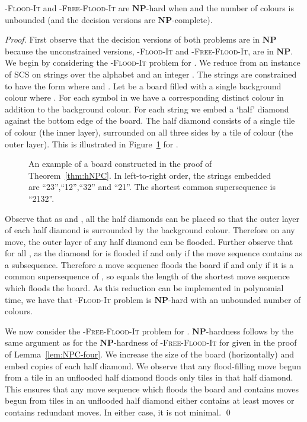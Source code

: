 \documentclass[a4paper,11pt]{llncs}
\newcommand{\pgfgraphic}[1]{}
\newcounter{l}
\newcommand{\NPtime}{\ensuremath{\mathbf{NP}}}
\newcommand{\Coloroid}[1]{-\textsc{Flood-It}}
\newcommand{\ColoroidFree}[1]{-\textsc{Free-Flood-It}}
\newcommand{\SCS}{\textsc{SCS}}
\newcommand{\recdim}[2]{}
\begin{document}
\begin{theorem}
    \label{thm:hNPC}
     \Coloroid{(c,h)} and \ColoroidFree{(c,h)} are \NPtime-hard when  and the number of colours  is unbounded (and the decision versions are \NPtime-complete).
\end{theorem}
\begin{proof}
First observe that the decision versions of both problems are in \NPtime{} because the unconstrained versions, \Coloroid{c} and \ColoroidFree{c}, are in \NPtime{}. We begin by considering the \Coloroid{(c,h)} problem for . We reduce from an instance of \SCS{} on  strings  over the alphabet  and an integer . The strings are constrained to have the form  where  and . Let  be a \recdim{h}{n} board filled with a single background colour where . For each symbol in  we have a corresponding distinct colour in addition to the background colour. For each string  we embed a `half' diamond against the bottom edge of the board. The half diamond consists of a single tile of colour  (the inner layer), surrounded on all three sides by a tile of colour  (the outer layer). This is illustrated in Figure~\ref{fig:height3} for .

\begin{figure}[t]
    \centering
	\pgfgraphic{graphic-height3}
    \caption{An example of a board constructed in the proof of Theorem~\ref{thm:hNPC}. In left-to-right order, the strings embedded are ``23'',``12'',``32'' and ``21''. The shortest common supersequence is ``2132''.}
    \label{fig:height3}
\end{figure}

Observe that as  and , all the half diamonds can be placed so that the outer layer of each half diamond is surrounded by the background colour. Therefore on any move, the outer layer of any half diamond can be flooded. Further observe that for all , as  the diamond for  is flooded if and only if the move sequence contains  as a subsequence. Therefore a move sequence floods the board if and only if it is a common supersequence of , so  equals the length of the shortest move sequence which floods the board. As this reduction can be implemented in polynomial time, we have that \Coloroid{(c,h)} problem is \NPtime-hard with an unbounded number of colours.

We now consider the \ColoroidFree{(c,h)} problem for . \NPtime-hardness follows by the same argument as for the \NPtime-hardness of \ColoroidFree{c} for  given in the proof of Lemma~\ref{lem:NPC-four}. We increase the size of the board (horizontally) and embed  copies of each half diamond. We observe that any flood-filling move begun from a tile in an unflooded half diamond floods only tiles in that half diamond. This ensures that any move sequence which floods the board and contains moves begun from tiles in an unflooded half diamond either contains at least  moves or contains redundant moves. In either case, it is not minimal. \qed
\end{proof}
\end{document}
